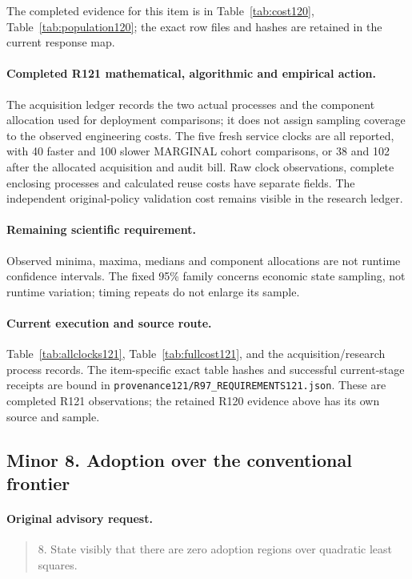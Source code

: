 The completed evidence for this item is in Table~\ref{tab:cost120}, Table~\ref{tab:population120}; the exact row files and hashes are retained in the current response map.

\paragraph{Completed R121 mathematical, algorithmic and empirical action.}
The acquisition ledger records the two actual processes and the component allocation used for deployment comparisons; it does not assign sampling coverage to the observed engineering costs. The five fresh service clocks are all reported, with 40 faster and 100 slower MARGINAL cohort comparisons, or 38 and 102 after the allocated acquisition and audit bill. Raw clock observations, complete enclosing processes and calculated reuse costs have separate fields. The independent original-policy validation cost remains visible in the research ledger.

\paragraph{Remaining scientific requirement.}
Observed minima, maxima, medians and component allocations are not runtime confidence intervals. The fixed 95\% family concerns economic state sampling, not runtime variation; timing repeats do not enlarge its sample.

\paragraph{Current execution and source route.}
Table~\ref{tab:allclocks121}, Table~\ref{tab:fullcost121}, and the acquisition/research process records.
The item-specific exact table hashes and successful current-stage receipts are bound in \nolinkurl{provenance121/R97_REQUIREMENTS121.json}. These are completed R121 observations; the retained R120 evidence above has its own source and sample.

\subsection{Minor 8. Adoption over the conventional frontier}
\label{response121:minor-8}

\paragraph{Original advisory request.}
\begin{quote}
8. State visibly that there are zero adoption regions over quadratic least squares.
\end{quote}

